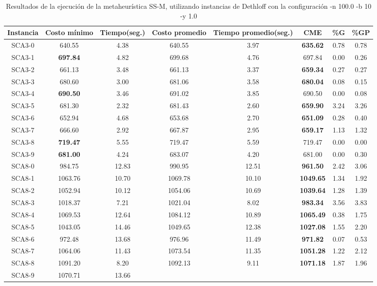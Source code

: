 \begin{table}[h]
\caption{Resultados de la ejecución de la metaheurística SS-M, utilizando instancias de Dethloff con la configuración -n 100.0 -b 10 -y 1.0}
\centering
\small
\begin{tabular}{c c c c c c c c}
\hline\hline
Instancia & Costo mínimo & Tiempo(seg.) & Costo promedio & Tiempo promedio(seg.) & CME & \%G & \%GP \\ [0.5ex]
\hline
SCA3-0 & 640.55 & 4.38 & 
640.55 & 3.97 & \bf{635.62} & 
0.78 & 0.78\\SCA3-1 & \bf{697.84} & 4.82 & 
699.68 & 4.76 & 697.84 & 0.00
 & 0.26\\SCA3-2 & 661.13 & 3.48 & 
661.13 & 3.37 & \bf{659.34} & 
0.27 & 0.27\\SCA3-3 & 680.60 & 3.00 & 
681.06 & 3.58 & \bf{680.04} & 
0.08 & 0.15\\SCA3-4 & \bf{690.50} & 3.46 & 
691.02 & 3.85 & 690.50 & 0.00
 & 0.08\\SCA3-5 & 681.30 & 2.32 & 
681.43 & 2.60 & \bf{659.90} & 
3.24 & 3.26\\SCA3-6 & 652.94 & 4.68 & 
653.68 & 2.70 & \bf{651.09} & 
0.28 & 0.40\\SCA3-7 & 666.60 & 2.92 & 
667.87 & 2.95 & \bf{659.17} & 
1.13 & 1.32\\SCA3-8 & \bf{719.47} & 5.55 & 
719.47 & 5.59 & 719.47 & 0.00
 & 0.00\\
SCA3-9 & \bf{681.00} & 4.24 & 
683.07 & 4.20 & 681.00 & 0.00
 & 0.30\\SCA8-0 & 984.75 & 12.83 & 
990.95 & 12.51 & \bf{961.50} & 
2.42 & 3.06\\SCA8-1 & 1063.76 & 10.70 & 
1069.78 & 10.10 & \bf{1049.65} & 
1.34 & 1.92\\SCA8-2 & 1052.94 & 10.12 & 
1054.06 & 10.69 & \bf{1039.64} & 
1.28 & 1.39\\SCA8-3 & 1018.37 & 7.21 & 
1021.04 & 8.02 & \bf{983.34} & 
3.56 & 3.83\\SCA8-4 & 1069.53 & 12.64 & 
1084.12 & 10.89 & \bf{1065.49} & 
0.38 & 1.75\\SCA8-5 & 1043.05 & 14.46 & 
1049.65 & 12.38 & \bf{1027.08} & 
1.55 & 2.20\\SCA8-6 & 972.48 & 13.68 & 
976.96 & 11.49 & \bf{971.82} & 
0.07 & 0.53\\SCA8-7 & 1064.06 & 11.43 & 
1073.54 & 11.35 & \bf{1051.28} & 
1.22 & 2.12\\SCA8-8 & 1091.20 & 8.20 & 
1092.13 & 9.11 & \bf{1071.18} & 
1.87 & 1.96\\SCA8-9 & 1070.71 & 13.66 & 

\end{tabular}
\end{table}
